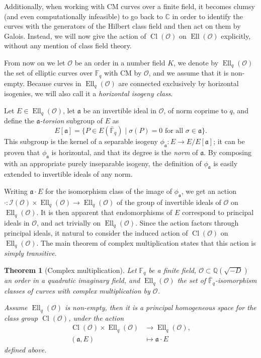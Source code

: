 \documentclass[10pt]{article}
\theoremstyle{plain}
\newtheorem{theorem}{Theorem}
\theoremstyle{definition}
\DeclareMathOperator{\Cl}{Cl}
\DeclareMathOperator{\Ell}{Ell}
\def\F{\ensuremath{\mathbb{F}}}
\def\O{\ensuremath{\mathcal{O}}}
\def\a{\ensuremath{\mathfrak{a}}}
\begin{document}
\begin{prposition}
Additionally, when working with CM curves over a finite field, it
becomes clumsy (and even computationally infeasible) to go back to $ℂ$
in order to identify the curves with the generators of the Hilbert
class field and then act on them by Galois. %
Instead, we will now give the action of $\Cl(\O)$ on $\Ell(\O)$
explicitly, without any mention of class field theory. %

From now on we let $\O$ be an order in a number field $K$, we denote
by $\Ell_q(\O)$ the set of elliptic curves over $\F_q$ with CM by
$\O$, and we assume that it is non-empty. %
Because curves in $\Ell_q(\O)$ are connected exclusively by horizontal
isogenies, we will also call it a \emph{horizontal isogeny class}.

Let $E∈\Ell_q(\O)$, let $\a$ be an invertible ideal in $\O$, of norm
coprime to $q$, and define the \emph{${\a}$-torsion} subgroup of $E$
as
\begin{equation*}
  \label{eq:a-torsion}
  E[\a] = \{P ∈ E(\bar{\F}_q) \mid σ(P) = 0
  \text{ for all } σ ∈ \a \}.
\end{equation*}
This subgroup is the kernel of a separable isogeny
$\phi_{\a}:E→E/E[\a]$; it can be proven that $\phi_{\a}$ is
horizontal, and that its degree is the \emph{norm} of $\a$. %
By composing with an appropriate purely inseparable isogeny, the
definition of $ϕ_\a$ is easily extended to invertible ideals of any
norm.

Writing $\a·E$ for the isomorphism class of the image of $ϕ_\a$, we
get an action $·:\mathcal{I}(\O)×\Ell_q(\O)→\Ell_q(\O)$ of the group
of invertible ideals of $\O$ on $\Ell_q(\O)$. %
It is then apparent that endomorphisms of $E$ correspond to principal
ideals in $\O$, and act trivially on $\Ell_q(\O)$. %
Since the action factors through principal ideals, it natural to
consider the induced action of $\Cl(\O)$ on $\Ell_q(\O)$. %
The main theorem of complex multiplication states that this action is
\emph{simply transitive}. %

\begin{theorem}[Complex multiplication]
  Let $\F_q$ be a finite field, $\O⊂ℚ(\sqrt{-D})$ an order in a
  quadratic imaginary field, and $\Ell_q(\O)$ the set of
  $\bar{\F}_q$-isomorphism classes of curves with complex
  multiplication by $\O$. %

  Assume $\Ell_q(\O)$ is non-empty, then it is a \emph{principal
    homogeneous space} for the class group $\Cl(\O)$, under the action
  \begin{align*}
    \Cl(\O) × \Ell_q(\O) &→ \Ell_q(\O),\\
    (\a,E)  &↦ \a·E
  \end{align*}
  defined above.
\end{theorem}


\end{prposition}
\end{document}
